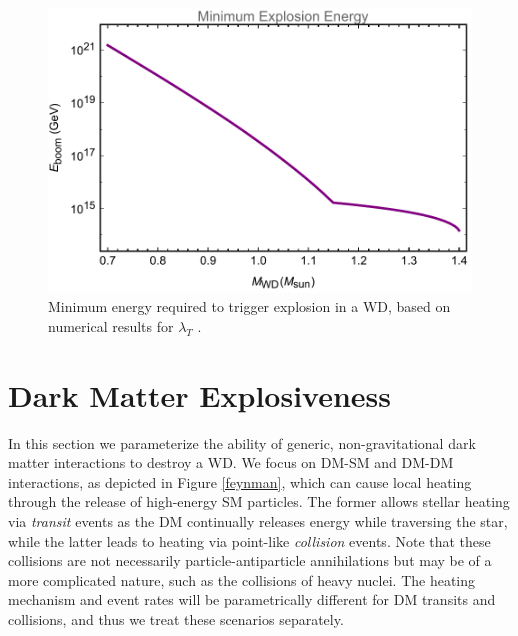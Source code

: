 \documentclass[twocolumn,showpacs,preprintnumbers,amsmath,amssymb,prd]{revtex4}
\begin{document}
\begin{figure}
\includegraphics[scale=.45]{Eboom.pdf}
\caption{Minimum energy required to trigger explosion in a WD, based on numerical results for $\lambda_T$ \cite{Woosley}.}
\label{fig:Eboom}
\end{figure}

\section{Dark Matter Explosiveness}
\label{sec:DMexplode}

In this section we parameterize the ability of generic, non-gravitational dark matter interactions to destroy a WD.  We focus on DM-SM and DM-DM interactions, as depicted in Figure \ref{feynman}, which can cause local heating through the release of high-energy SM particles. The former allows stellar heating via \emph{transit} events as the DM continually releases energy while traversing the star, while the latter leads to heating via point-like \emph{collision} events.  Note that these collisions are not necessarily particle-antiparticle annihilations but may be of a more complicated nature, such as the collisions of heavy nuclei.  The heating mechanism and event rates will be parametrically different for DM transits and collisions, and thus we treat these scenarios separately.
\end{document}
